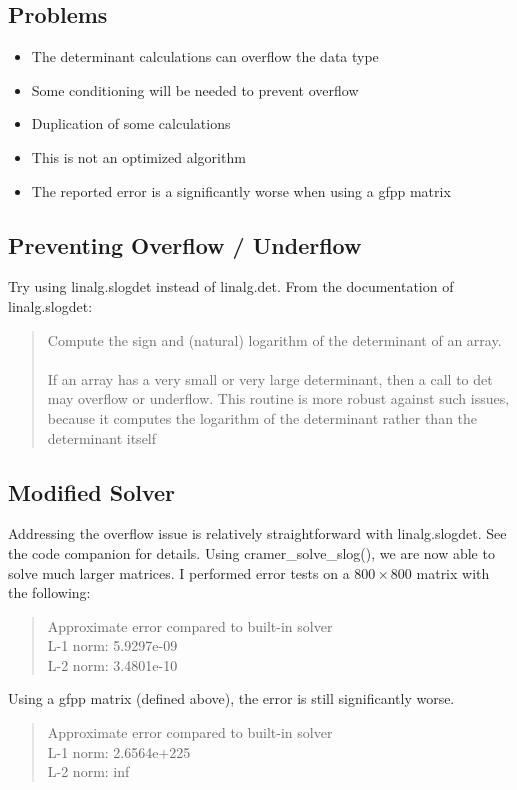 \documentclass[12pt]{article}
\begin{document}
\subsection{Problems}
\begin{itemize}
	\item The determinant calculations can overflow the data type
	\item Some conditioning will be needed to prevent overflow
	\item Duplication of some calculations
	\item This is not an optimized algorithm
	\item The reported error is a significantly worse when using  a gfpp matrix
\end{itemize}

\subsection{Preventing Overflow / Underflow}
Try using linalg.slogdet instead of linalg.det. From the documentation of linalg.slogdet:
\begin{quote}
	Compute the sign and (natural) logarithm of the determinant of an array.
	\\\\
	If an array has a very small or very large determinant, then a call to det may overflow or underflow. This routine is more robust against such issues, because it computes the logarithm of the determinant rather than the determinant itself
\end{quote}

\subsection{Modified Solver}
Addressing the overflow issue is relatively straightforward with linalg.slogdet. See the code companion for details. Using cramer\_solve\_slog(), we are now able to solve much larger matrices. I performed error tests on a $800 \times 800$ matrix with the following:
\begin{quote}
	Approximate error compared to built-in solver \\
	L-1 norm: 5.9297e-09 \\
	L-2 norm: 3.4801e-10
\end{quote}
Using a gfpp matrix (defined above), the error is still significantly worse.
\begin{quote}
	Approximate error compared to built-in solver \\
	L-1 norm: 2.6564e+225 \\
	L-2 norm: inf
\end{quote}
\end{document}
